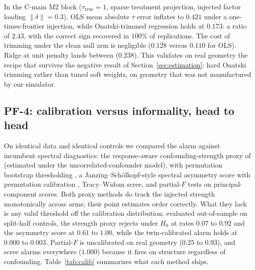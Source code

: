In the C-main M2 block ($\tau_{\mathrm{true}} = 1$, sparse treatment projection, injected factor loading $\|\delta\| = 0.3$), OLS mean absolute $\tau$ error inflates to $0.421$ under a one-times-frontier injection, while Onatski-trimmed regression holds at $0.173$: a ratio of $2.43$, with the correct sign recovered in $100\%$ of replications. The cost of trimming under the clean null arm is negligible ($0.128$ versus $0.110$ for OLS). Ridge at unit penalty lands between ($0.238$). This validates on real geometry the recipe that survives the negative result of Section~\ref{sec:estimation}: hard Onatski trimming rather than tuned soft weights, on geometry that was not manufactured by our simulator.

\subsection*{PF-4: calibration versus informality, head to head}

On identical data and identical controls we compared the alarm against incumbent spectral diagnostics: the response-aware confounding-strength proxy of \citet{rendsburg2024consistent} (estimated under the uncorrelated-confounder model), with permutation bootstrap thresholding \citep{rendsburg2024consistent}, a Janzing--Sch{\"o}lkopf-style spectral asymmetry score with permutation calibration \citep{janzing2018detecting}, Tracy--Widom scree, and partial-$F$ tests on principal-component scores. Both proxy methods do track the injected strength monotonically across arms; their point estimates order correctly. What they lack is any valid threshold off the calibration distribution: evaluated out-of-sample on split-half controls, the strength proxy rejects under $H_0$ at rates $0.07$ to $0.92$ and the asymmetry score at $0.61$ to $1.00$, while the twin-calibrated alarm holds at $0.000$ to $0.003$. Partial-$F$ is uncalibrated on real geometry ($0.25$ to $0.93$), and scree alarms everywhere ($1.000$) because it fires on structure regardless of confounding. Table~\ref{tab:calib} summarizes what each method ships.

